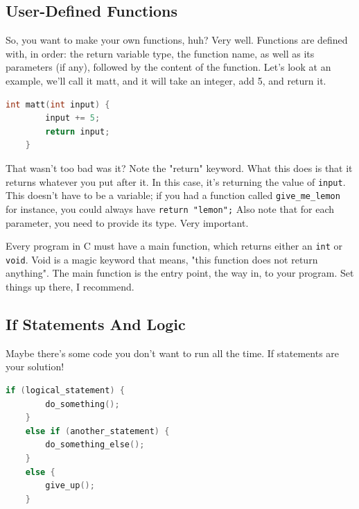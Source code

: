 \subsection{User-Defined Functions}
So, you want to make your own functions, huh? Very well. Functions are defined with, in order: the return variable type, the function name, as well as its \glspl{parameter} (if any), followed by the content of the function. Let's look at an example, we'll call it matt, and it will take an integer, add 5, and return it.
\begin{lstlisting}[language=C]
    int matt(int input) {
        input += 5;
        return input;
    }
\end{lstlisting}

That wasn't too bad was it? Note the "return" keyword. What this does is that it returns whatever you put after it. In this case, it's returning the value of \texttt{input}. This doesn't have to be a variable; if you had a function called \texttt{give\_me\_lemon} for instance, you could always have \texttt{return "lemon";} Also note that for each parameter, you need to provide its type. Very important.

Every program in C must have a main function, which returns either an \texttt{int} or \texttt{void}. Void is a magic keyword that means, "this function does not return anything". The main function is the entry point, the way in, to your program. Set things up there, I recommend.

\subsection{If Statements And Logic}
Maybe there's some code you don't want to run all the time. If statements are your solution!
\begin{lstlisting}[language=C]
    if (logical_statement) {
        do_something();
    }
    else if (another_statement) {
        do_something_else();
    }
    else {
        give_up();
    }
\end{lstlisting}
